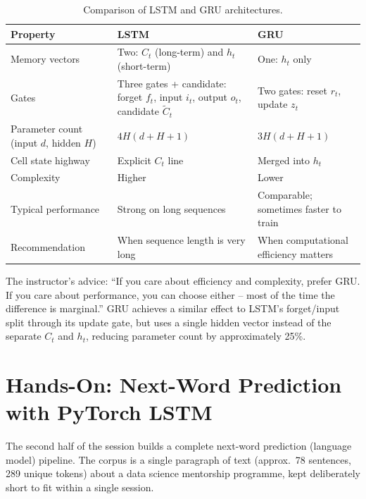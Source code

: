 \documentclass[12pt,a4paper]{article}
\begin{document}
\begin{table}[ht]
\centering
\caption{Comparison of LSTM and GRU architectures.}
\label{tab:lstm-gru}
\begin{tabularx}{\textwidth}{lXX}
\toprule
\textbf{Property}           & \textbf{LSTM}                              & \textbf{GRU} \\
\midrule
Memory vectors              & Two: $C_t$ (long-term) and $h_t$ (short-term) & One: $h_t$ only \\
Gates                       & Three gates + candidate: forget $f_t$, input $i_t$, output $o_t$, candidate $\tilde{C}_t$ & Two gates: reset $r_t$, update $z_t$ \\
Parameter count (input $d$, hidden $H$) & $4H(d+H+1)$ & $3H(d+H+1)$ \\
Cell state highway          & Explicit $C_t$ line                        & Merged into $h_t$ \\
Complexity                  & Higher                                     & Lower \\
Typical performance         & Strong on long sequences                   & Comparable; sometimes faster to train \\
Recommendation              & When sequence length is very long          & When computational efficiency matters \\
\bottomrule
\end{tabularx}
\end{table}

\begin{keyinsight}[title=When to Choose LSTM vs.\ GRU]
  The instructor's advice: ``If you care about efficiency and complexity,
  prefer GRU.  If you care about performance, you can choose either -- most of
  the time the difference is marginal.''  GRU achieves a similar effect to
  LSTM's forget/input split through its update gate, but uses a single hidden
  vector instead of the separate $C_t$ and $h_t$, reducing parameter count by
  approximately 25\%.
\end{keyinsight}

\section{Hands-On: Next-Word Prediction with PyTorch LSTM}
\label{sec:handson}

The second half of the session builds a complete next-word prediction
(language model) pipeline.  The corpus is a single paragraph of text
(approx.\ 78 sentences, 289 unique tokens) about a data science mentorship
programme, kept deliberately short to fit within a single session.
\end{document}
